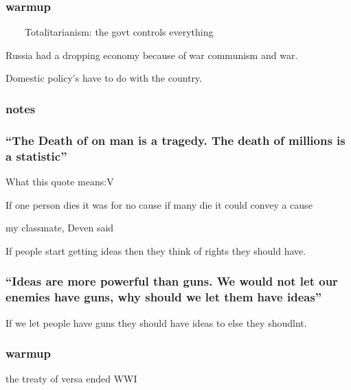 
\subsubsection{warmup}

\ \ \ \ Totalitarianism: the govt controls everything

Russia had a dropping economy because of war communism and war. 

Domestic policy's have to do with the country.

\subsubsection{notes}

\subsubsection{``The Death of on man is a tragedy. The death of millions is a statistic''}

What this quote means:V

If one person dies it was for no cause if many die it could convey a cause

my classmate, Deven said

If people start getting ideas then they think of rights they should have.

\subsubsection{``Ideas are more powerful than guns. We would not let our enemies have guns, why should we let them have ideas''}

If we let people have guns they should have ideas to else they shoudlnt.

\subsubsection{warmup}
the treaty of versa ended WWI

